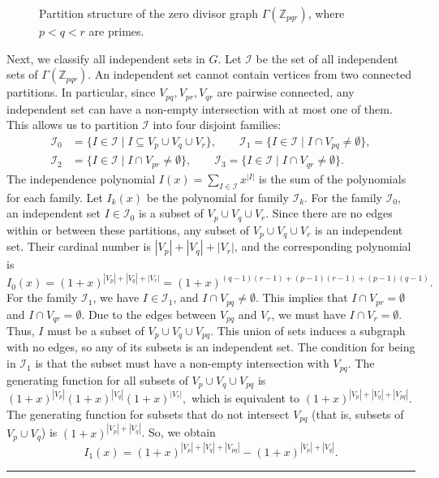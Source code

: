 \documentclass[12pt,twoside]{article}
\renewenvironment{proof}{{\noindent\bfseries Proof.}}{\qed}
\def\qed{\nolinebreak\hfill\rule{.2cm}{.2cm}\par\addvspace{.5cm}}
\begin{document}
\begin{proof}
\begin{figure}[H]
\begin{tikzpicture}[
		part/.style={
			ellipse,
			draw,
			thick,
			minimum width=3.3cm,
			minimum height=1.25cm,
			align=center,
			font=\small
		},
		edge/.style={thick},
		complete/.style={thick}
		]
	\end{tikzpicture}
	\caption{Partition structure of the zero divisor graph $\varGamma(\mathbb{Z}_{pqr})$, where $p<q<r$ are primes.}
	\label{fig:zero-divisor-pqr-partition}
\end{figure} 
Next, we classify all independent sets in $G.$
Let $\mathcal{I}$ be the set of all independent sets of $\varGamma(\mathbb{Z}_{pqr})$. An independent set cannot contain vertices from two connected partitions. In particular, since $V_{pq}, V_{pr}, V_{qr}$ are pairwise connected, any independent set can have a non-empty intersection with at most one of them. This allows us to partition $\mathcal{I}$ into four disjoint families: 
\begin{align*}
	\mathcal{I}_0 &= \{I \in \mathcal{I} \mid I \subseteq V_p \cup V_q \cup V_r\},\qquad \mathcal{I}_1 = \{I \in \mathcal{I} \mid I \cap V_{pq} \neq \emptyset\},\\
 	\mathcal{I}_2 &= \{I \in \mathcal{I} \mid I \cap V_{pr} \neq \emptyset\},\qquad \mathcal{I}_3 = \{I \in \mathcal{I} \mid I \cap V_{qr} \neq \emptyset\}.
\end{align*}
The independence polynomial $I(x) = \sum_{I \in \mathcal{I}} x^{|I|}$ is the sum of the polynomials for each family. Let $I_k(x)$ be the polynomial for family $\mathcal{I}_k$. For the family $\mathcal{I}_0$, an independent set $I \in \mathcal{I}_0$ is a subset of $V_p \cup V_q \cup V_r$. Since there are no edges within or between these partitions, any subset of $V_p \cup V_q \cup V_r$ is an independent set. Their cardinal number is $|V_p|+|V_q|+|V_r|$, and the corresponding polynomial is
$$I_0(x) = (1+x)^{|V_p|+|V_q|+|V_r|} = (1+x)^{(q-1)(r-1)+(p-1)(r-1)+(p-1)(q-1)}.$$
For the family $\mathcal{I}_1$, we have $I \in \mathcal{I}_1$, and $I \cap V_{pq} \neq \emptyset$. This implies that $I \cap V_{pr} = \emptyset$ and $I \cap V_{qr} = \emptyset$. Due to the edges between $V_{pq}$ and $V_r$, we must have $I \cap V_r = \emptyset$. Thus, $I$ must be a subset of $V_p \cup V_q \cup V_{pq}$. This union of sets induces a subgraph with no edges, so any of its subsets is an independent set. The condition for being in $\mathcal{I}_1$ is that the subset must have a non-empty intersection with $V_{pq}$.
The generating function for all subsets of $V_p \cup V_q \cup V_{pq}$ is $(1+x)^{|V_p|}(1+x)^{|V_q|}(1+x)^{|V_r|},$ which is equivalent to
$(1+x)^{|V_p|+|V_q|+|V_{pq}|}$.
The generating function for subsets that do not intersect $V_{pq}$ (that is, subsets of $V_p \cup V_q$) is $(1+x)^{|V_p|+|V_q|}$.
So, we obtain $$I_1(x) = (1+x)^{|V_p|+|V_q|+|V_{pq}|} - (1+x)^{|V_p|+|V_q|}.$$

\end{proof}
\end{document}
